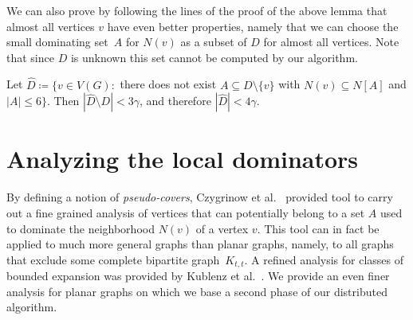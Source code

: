\documentclass[a4paper,UKenglish,cleveref, autoref, thm-restate]{lipics-v2021}
\begin{document}
We can also prove by following the lines of the proof of the above
lemma that almost all vertices $v$ have even better properties,
namely that we can choose the small dominating set~$A$ for $N(v)$ as a
subset of $D$ for almost all vertices.
Note that since $D$ is unknown this set cannot be computed by our algorithm.

\begin{lemma}\label{lem:D-hat}
Let $\hat{D}\coloneqq \{v\in V(G) : $ there does not
exist $A\subseteq D\setminus \{v\}$ with $N(v)\subseteq N[A]$
and $|A|\leq 6\}$. Then $|\hat{D}\setminus D|< 3\gamma$, and
therefore $|\hat{D}|< 4\gamma$.
\end{lemma}


\section{Analyzing the local dominators}

By defining a notion of \emph{pseudo-covers}, Czygrinow et  al.~\cite{czygrinow2018distributed} provided tool to carry out a
fine grained analysis of
vertices that can potentially belong to a set $A$ used to dominate
the neighborhood $N(v)$ of a vertex $v$. This tool can in fact
be applied to much more general graphs than planar graphs, namely,
to all graphs that exclude some complete bipartite graph~$K_{t,t}$.
A refined analysis for classes of bounded expansion was provided
by Kublenz et al.~\cite{kublenz2020distributed}.
We provide an even finer analysis for planar graphs on which we
base a second phase of our distributed algorithm.


\end{document}
